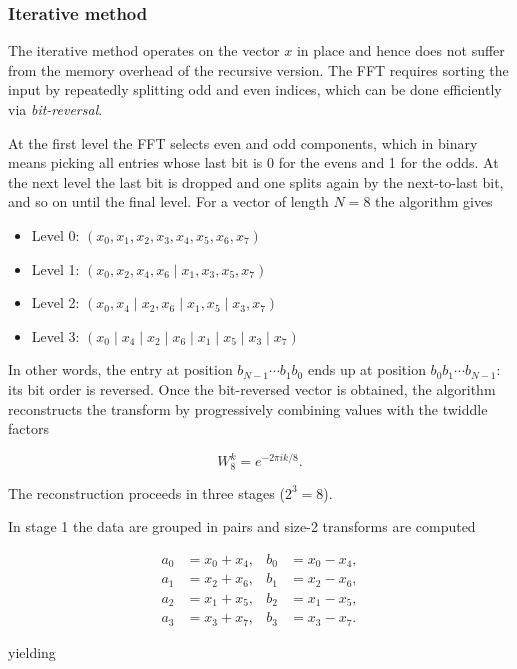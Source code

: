 \documentclass[11pt,a4paper,twoside,pdf]{article}
\numberwithin{equation}{section}
\begin{document}
\subsubsection{Iterative method}


The iterative method operates on the vector $x$ in place and hence does not suffer from the memory overhead of the recursive version. The FFT requires sorting the input by repeatedly splitting odd and even indices, which can be done efficiently via \textit{bit-reversal}.

At the first level the FFT selects even and odd components, which in binary means picking all entries whose last bit is 0 for the evens and 1 for the odds. At the next level the last bit is dropped and one splits again by the next-to-last bit, and so on until the final level. For a vector of length $N = 8$ the algorithm gives

\begin{itemize}
    \item Level 0: \qquad $(x_0, x_1, x_2, x_3, x_4, x_5, x_6, x_7)$
    \item Level 1: \qquad $(x_0, x_2, x_4, x_6 \mid x_1, x_3, x_5, x_7)$
    \item Level 2: \qquad $(x_0, x_4 \mid x_2, x_6 \mid x_1, x_5 \mid x_3, x_7)$
    \item Level 3: \qquad $(x_0 \mid x_4 \mid x_2 \mid x_6 \mid x_1 \mid x_5 \mid x_3 \mid x_7)$
\end{itemize}

In other words, the entry at position $b_{N-1}\cdots b_{1}b_{0}$ ends up at position $b_0 b_{1}\cdots b_{N-1}$: its bit order is reversed. Once the bit-reversed vector is obtained, the algorithm reconstructs the transform by progressively combining values with the twiddle factors

\[
W_8^k = e^{-2\pi i k/8}.
\]


The reconstruction proceeds in three stages ($2^3 = 8$).

In stage 1 the data are grouped in pairs and size-2 transforms are computed

\[
\begin{aligned}
a_0 &= x_0 + x_4, & b_0 &= x_0 - x_4,\\
a_1 &= x_2 + x_6, & b_1 &= x_2 - x_6,\\
a_2 &= x_1 + x_5, & b_2 &= x_1 - x_5,\\
a_3 &= x_3 + x_7, & b_3 &= x_3 - x_7.
\end{aligned}
\]

yielding
\end{document}
